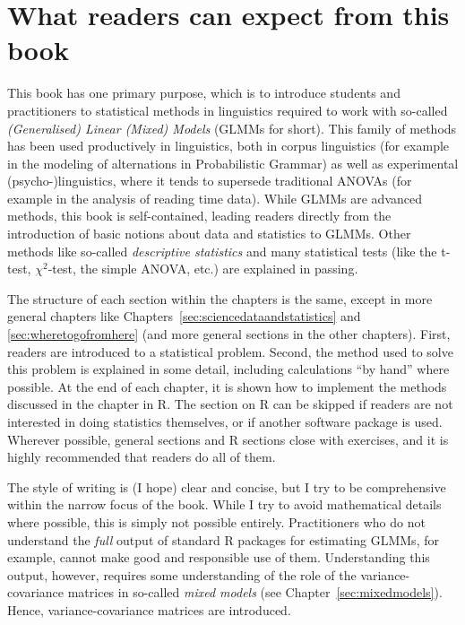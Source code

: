 
\section*{What readers can expect from this book}

This book has one primary purpose, which is to introduce students and practitioners to statistical methods in linguistics required to work with so-called \textit{(Generalised) Linear (Mixed) Models} (GLMMs for short).
This family of methods has been used productively in linguistics, both in corpus linguistics (for example in the modeling of alternations in Probabilistic Grammar) as well as experimental (psycho-)linguistics, where it tends to supersede traditional ANOVAs (for example in the analysis of reading time data).
While GLMMs are advanced methods, this book is self-contained, leading readers directly from the introduction of basic notions about data and statistics to GLMMs.
Other methods like so-called \textit{descriptive statistics} and many statistical tests (like the t-test, $\chi^2$-test, the simple ANOVA, etc.) are explained in passing.

The structure of each section within the chapters is the same, except in more general chapters like Chapters~\ref{sec:sciencedataandstatistics} and \ref{sec:wheretogofromhere} (and more general sections in the other chapters).
First, readers are introduced to a statistical problem.
Second, the method used to solve this problem is explained in some detail, including calculations ``by hand'' where possible.
At the end of each chapter, it is shown how to implement the methods discussed in the chapter in R.
The section on R can be skipped if readers are not interested in doing statistics themselves, or if another software package is used.
Wherever possible, general sections and R sections close with exercises, and it is highly recommended that readers do all of them.

The style of writing is (I hope) clear and concise, but I try to be comprehensive within the narrow focus of the book.
While I try to avoid mathematical details where possible, this is simply not possible entirely.
Practitioners who do not understand the \textit{full} output of standard R packages for estimating GLMMs, for example, cannot make good and responsible use of them.
Understanding this output, however, requires some understanding of the role of the variance-covariance matrices in so-called \textit{mixed models} (see Chapter~\ref{sec:mixedmodels}).
Hence, variance-covariance matrices are introduced.

